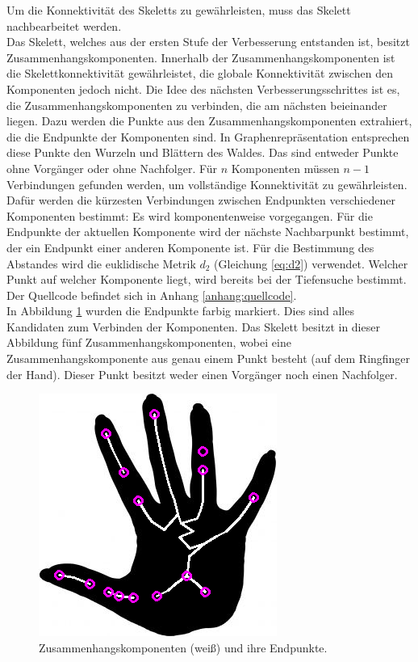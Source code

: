 Um die Konnektivität des Skeletts zu gewährleisten, muss das Skelett nachbearbeitet werden. \\
Das Skelett, welches aus der ersten Stufe der Verbesserung entstanden ist, besitzt Zusammenhangskomponenten. Innerhalb der Zusammenhangskomponenten ist die Skelettkonnektivität gewährleistet, die globale Konnektivität zwischen den Komponenten jedoch nicht. Die Idee des
nächsten Verbesserungsschrittes ist es, die Zusammenhangskomponenten
zu verbinden, die am nächsten beieinander liegen. Dazu werden
die Punkte aus den Zusammenhangskomponenten extrahiert, die die Endpunkte der Komponenten sind. In Graphenrepräsentation entsprechen diese Punkte den Wurzeln und Blättern des Waldes. Das sind
entweder Punkte ohne Vorgänger oder ohne Nachfolger. Für $n$ Komponenten müssen $n-1$ Verbindungen gefunden werden, um vollständige Konnektivität zu gewährleisten. Dafür werden die kürzesten Verbindungen zwischen Endpunkten verschiedener Komponenten bestimmt:
Es wird komponentenweise vorgegangen.
Für die Endpunkte der aktuellen Komponente wird der nächste Nachbarpunkt bestimmt, der ein Endpunkt einer anderen Komponente ist. Für die Bestimmung des Abstandes wird die euklidische Metrik $d_2$ (Gleichung \ref{eq:d2}) verwendet. Welcher Punkt auf welcher Komponente liegt, wird bereits bei der Tiefensuche bestimmt. Der Quellcode befindet sich in Anhang \ref{anhang:quellcode}. \\
In Abbildung \ref{fig:offeneenden} wurden die Endpunkte farbig markiert. Dies sind
alles Kandidaten zum Verbinden der Komponenten. Das Skelett besitzt in dieser Abbildung fünf Zusammenhangskomponenten,
wobei eine Zusammenhangskomponente aus genau einem Punkt besteht
(auf dem Ringfinger der Hand). Dieser Punkt besitzt weder einen Vorgänger noch einen Nachfolger.
\begin{figure}[ht]
\centering
\includegraphics[width=0.4\linewidth]{./fig/offeneEnden.png}
\caption{Zusammenhangskomponenten (weiß) und ihre Endpunkte.}
\label{fig:offeneenden}
\end{figure}
